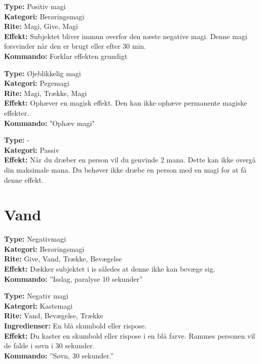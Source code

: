 \begin{primærMagi*}
\textbf{Type:} Positiv magi\\
\textbf{Kategori:} Berøringsmagi\\
\textbf{Rite:} Magi, Give, Magi\\
\textbf{Effekt:} Subjektet bliver immun overfor den næste negative magi. Denne magi forsvinder når den er brugt eller efter 30 min.\\
\textbf{Kommando:} Forklar effekten grundigt
\end{primærMagi*}

\begin{primærMagi*}
\textbf{Type:} Øjeblikkelig magi\\
\textbf{Kategori:} Pegemagi\\
\textbf{Rite:} Magi, Trække, Magi\\
\textbf{Effekt:} Ophæver en magisk effekt. Den kan ikke ophæve permanente magiske effekter.\\ 
\textbf{Kommando:} "Ophæv magi"
\end{primærMagi*}

\begin{primærMagi*}
\textbf{Type:} -\\
\textbf{Kategori:} Passiv\\
\textbf{Effekt:} Når du dræber en person vil du genvinde 2 mana. Dette kan ikke overgå din maksimale mana. Du behøver ikke dræbe en person med en magi for at få denne effekt.
\end{primærMagi*}

\section{Vand}
\begin{vand*}[Isslag]
\textbf{Type:} Negativmagi\\
\textbf{Kategori:} Berøringsmagi\\
\textbf{Rite:} Give, Vand, Trække, Bevægelse\\
\textbf{Effekt:} Dækker subjektet i is således at denne ikke kan bevæge sig.\\
\textbf{Kommando:} ”Isslag, paralyse 10 sekunder”
\end{vand*}

\begin{vand*}
\textbf{Type:} Negativ magi\\
\textbf{Kategori:} Kastemagi\\
\textbf{Rite:} Vand, Bevægelse, Trække\\
\textbf{Ingredienser:} En blå skumbold eller rispose.\\
\textbf{Effekt:} Du kaster en skumbold eller rispose i en blå farve. Rammes personen vil de falde i søvn i 30 sekunder.\\
\textbf{Kommando:} ”Søvn, 30 sekunder.”
\end{vand*}

